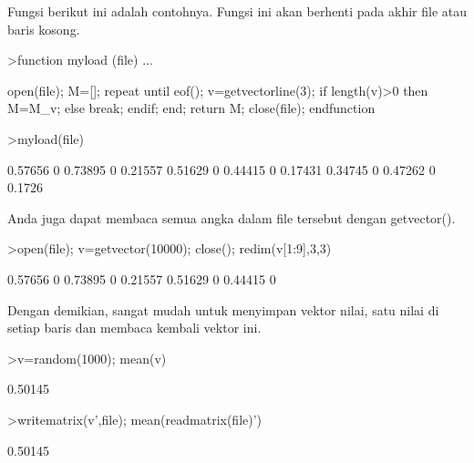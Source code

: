\documentclass[a4paper,10pt]{article}
\begin{document}
\begin{eulernotebook}
\begin{eulercomment}
\begin{eulercomment}
\begin{eulercomment}
\begin{eulercomment}
\begin{eulercomment}
\begin{eulercomment}
\begin{eulercomment}
\begin{eulercomment}
\begin{eulercomment}
\begin{eulercomment}
\begin{eulercomment}
\begin{eulercomment}
\begin{eulercomment}
\begin{eulercomment}
\begin{eulercomment}
\begin{eulercomment}
\begin{eulercomment}
\begin{eulercomment}
\begin{eulercomment}
\begin{eulercomment}
\begin{eulercomment}
\begin{eulercomment}
\begin{eulercomment}
\begin{eulercomment}
\begin{eulercomment}
Fungsi berikut ini adalah contohnya. Fungsi ini akan berhenti pada
akhir file atau baris kosong.
\end{eulercomment}
\begin{eulerprompt}
>function myload (file) ...
\end{eulerprompt}
\begin{eulerudf}
  open(file);
  M=[];
  repeat
     until eof();
     v=getvectorline(3);
     if length(v)>0 then M=M_v; else break; endif;
  end;
  return M;
  close(file);
  endfunction
\end{eulerudf}
\begin{eulerprompt}
>myload(file)
\end{eulerprompt}
\begin{euleroutput}
    0.57656         0   0.73895         0   0.21557 
    0.51629         0   0.44415         0   0.17431 
    0.34745         0   0.47262         0    0.1726 
\end{euleroutput}
\begin{eulercomment}
Anda juga dapat membaca semua angka dalam file tersebut dengan
getvector().
\end{eulercomment}
\begin{eulerprompt}
>open(file); v=getvector(10000); close(); redim(v[1:9],3,3)
\end{eulerprompt}
\begin{euleroutput}
    0.57656         0   0.73895 
          0   0.21557   0.51629 
          0   0.44415         0 
\end{euleroutput}
\begin{eulercomment}
Dengan demikian, sangat mudah untuk menyimpan vektor nilai, satu nilai
di setiap baris dan membaca kembali vektor ini.
\end{eulercomment}
\begin{eulerprompt}
>v=random(1000); mean(v)
\end{eulerprompt}
\begin{euleroutput}
  0.50145
\end{euleroutput}
\begin{eulerprompt}
>writematrix(v',file); mean(readmatrix(file)')
\end{eulerprompt}
\begin{euleroutput}
  0.50145

\end{euleroutput}
\end{eulercomment}
\end{eulercomment}
\end{eulercomment}
\end{eulercomment}
\end{eulercomment}
\end{eulercomment}
\end{eulercomment}
\end{eulercomment}
\end{eulercomment}
\end{eulercomment}
\end{eulercomment}
\end{eulercomment}
\end{eulercomment}
\end{eulercomment}
\end{eulercomment}
\end{eulercomment}
\end{eulercomment}
\end{eulercomment}
\end{eulercomment}
\end{eulercomment}
\end{eulercomment}
\end{eulercomment}
\end{eulercomment}
\end{eulercomment}
\end{eulernotebook}
\end{document}
